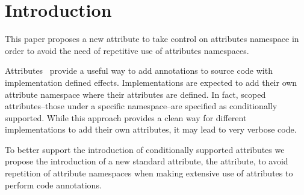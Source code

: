 \section{Introduction}

This paper proposes a new attribute to take control on attributes namespace
in order to avoid the need of repetitive use of attributes namespaces.

Attributes~\cite{n2761} provide a useful way to add annotations to source code with
implementation defined effects. Implementations are expected to add their
own attribute namespace where their attributes are defined. In fact,
scoped attributes--those under a specific namespace--are specified
as conditionally supported. While this approach
provides a clean way for different implementations to add their own attributes,
it may lead to very verbose code.

To better support the introduction of conditionally supported attributes we
propose the introduction of a new standard attribute, the  attribute,
to avoid repetition of attribute namespaces when making extensive use
of attributes to perform code annotations.
